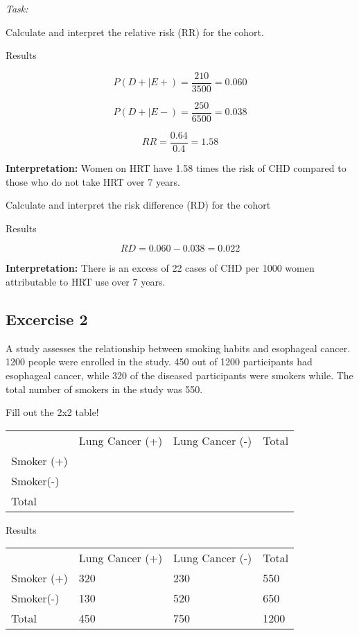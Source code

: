\documentclass[
  14pt,
  letterpaper,
  DIV=11,
  numbers=noendperiod]{scrreprt}
\begin{document}
\emph{Task:}

Calculate and interpret the relative risk (RR) for the cohort.

Results

\[
P(D+ \mid E+)= \frac{210}{3500} = 0.060
\]

\[
P(D+ \mid E-)= \frac{250}{6500} = 0.038
\]

\[
RR= \frac{0.64}{0.4} = 1.58
\]

\textbf{Interpretation:} Women on HRT have 1.58 times the risk of CHD
compared to those who do not take HRT over 7 years.

Calculate and interpret the risk difference (RD) for the cohort

Results

\[
RD= 0.060 - 0.038 = 0.022
\]

\textbf{Interpretation:} There is an excess of 22 cases of CHD per 1000
women attributable to HRT use over 7 years.

\subsection{Excercise 2}\label{excercise-2}

A study assesses the relationship between smoking habits and esophageal
cancer. 1200 people were enrolled in the study. 450 out of 1200
participants had esophageal cancer, while 320 of the diseased
participants were smokers while. The total number of smokers in the
study was 550.

Fill out the 2x2 table!

\begin{longtable}[]{@{}llll@{}}
\toprule\noalign{}
\endhead
\bottomrule\noalign{}
\endlastfoot
& Lung Cancer (+) & Lung Cancer (-) & Total \\
Smoker (+) & & & \\
Smoker(-) & & & \\
Total & & & \\
\end{longtable}

Results

\begin{longtable}[]{@{}llll@{}}
\toprule\noalign{}
\endhead
\bottomrule\noalign{}
\endlastfoot
& Lung Cancer (+) & Lung Cancer (-) & Total \\
Smoker (+) & 320 & 230 & 550 \\
Smoker(-) & 130 & 520 & 650 \\
Total & 450 & 750 & 1200 \\
\end{longtable}
\end{document}
